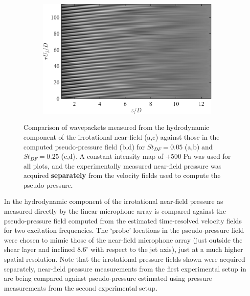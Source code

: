 \begin{figure}
\begin{subfigure}{.5\textwidth}
		\caption{}
	\end{subfigure}%
	\begin{subfigure}{.5\textwidth}
		\centering
		\includegraphics[width=0.95\linewidth]{Figures/ch5_st025_FlowField_wvpkts.png}
		\caption{}
	\end{subfigure}
	\caption{Comparison of wavepackets measured from the hydrodynamic component of the irrotational near-field (a,c) against those in the computed pseudo-pressure field (b,d) for $St_{DF} = 0.05$ (a,b) and $St_{DF} = 0.25$ (c,d). A constant intensity map of $\pm 500$ Pa was used for all plots, and the experimentally measured near-field pressure was acquired \textbf{separately} from the velocity fields used to compute the pseudo-pressure.}
	\label{fig:flowfield_wvpkts}
\end{figure}

In  the hydrodynamic component of the irrotational near-field pressure as measured directly by the linear microphone array is compared against the pseudo-pressure field computed from the estimated time-resolved velocity fields for two excitation frequencies. 
The `probe' locations in the pseudo-pressure field were chosen to mimic those of the near-field microphone array (just outside the shear layer and inclined $8.6^\circ$ with respect to the jet axis), just at a much higher spatial resolution.
Note that the irrotational pressure fields shown were acquired separately, \ie near-field pressure measurements from the first experimental setup in  are being compared against pseudo-pressure estimated using pressure measurements from the second experimental setup. 


